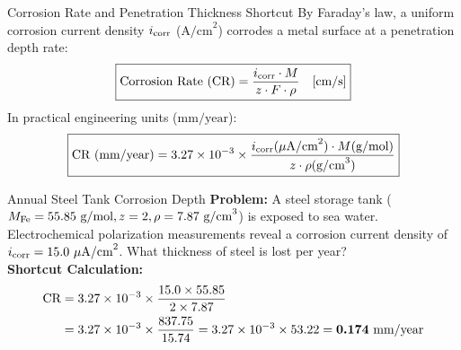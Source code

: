 \documentclass[11pt,a4paper]{report}
\newcommand{\ans}[1]{\ifmmode\bm{#1}\else\textbf{#1}\fi}
\begin{document}
\begin{shortcutbox}{Corrosion Rate and Penetration Thickness Shortcut}
By Faraday's law, a uniform corrosion current density $i_{\rm corr}$ ($\text{A/cm}^2$) corrodes a metal surface at a penetration depth rate:
\begin{equation}
\boxed{
\text{Corrosion Rate (CR)} = \frac{i_{\rm corr} \cdot M}{z \cdot F \cdot \rho} \quad [\text{cm/s}]
}
\end{equation}
In practical engineering units ($\text{mm/year}$):
\begin{equation}
\boxed{
\text{CR (mm/year)} = 3.27 \times 10^{-3} \times \frac{i_{\rm corr}(\mu\text{A/cm}^2) \cdot M(\text{g/mol})}{z \cdot \rho(\text{g/cm}^3)}
}
\end{equation}
\end{shortcutbox}

\begin{microbox}{Annual Steel Tank Corrosion Depth}
\textbf{Problem:} A steel storage tank ($M_{\ce{Fe}} = 55.85\text{ g/mol}, z = 2, \rho = 7.87\text{ g/cm}^3$) is exposed to sea water. Electrochemical polarization measurements reveal a corrosion current density of $i_{\rm corr} = 15.0\ \mu\text{A/cm}^2$. What thickness of steel is lost per year?\\
\textbf{Shortcut Calculation:}
\begin{align*}
\text{CR} &= 3.27 \times 10^{-3} \times \frac{15.0 \times 55.85}{2 \times 7.87} \\
&= 3.27 \times 10^{-3} \times \frac{837.75}{15.74} = 3.27 \times 10^{-3} \times 53.22 = \ans{0.174\text{ mm/year}}
\end{align*}
\end{microbox}
\end{document}
